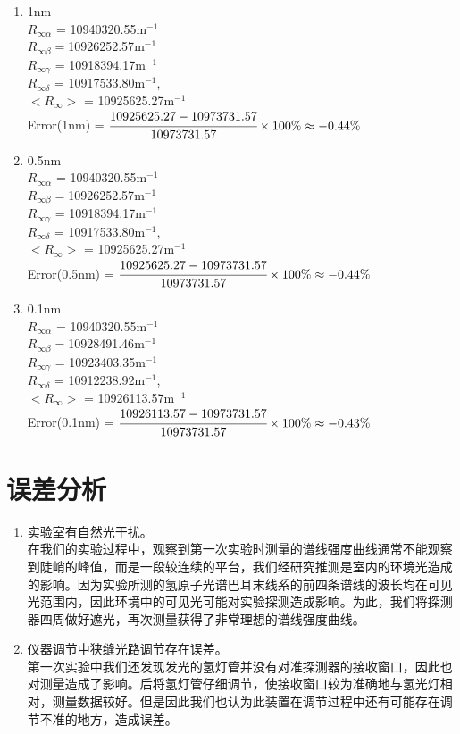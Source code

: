 \documentclass[a4paper]{article}
\begin{document}
\begin{enumerate}
\begin{enumerate}
\item 1nm\\
$R_{\infty\alpha}$ = 10940320.55$\text{m}^{-1}$\\
$R_{\infty\beta} = $10926252.57$\text{m}^{-1}$\\
$R_{\infty\gamma}$ = 10918394.17$\text{m}^{-1}$\\
$R_{\infty\delta}$ = 10917533.80$\text{m}^{-1}$,\\
$<R_{\infty}>$ = 10925625.27$\text{m}^{-1}$\\
Error(1nm) = $\cfrac{10925625.27 - 10973731.57}{10973731.57}\times 100\% \approx -0.44\%$
\item 0.5nm\\
$R_{\infty\alpha}$ = 10940320.55$\text{m}^{-1}$\\
$R_{\infty\beta} = $10926252.57$\text{m}^{-1}$\\
$R_{\infty\gamma}$ = 10918394.17$\text{m}^{-1}$\\
$R_{\infty\delta}$ = 10917533.80$\text{m}^{-1}$,\\
$<R_{\infty}>$ = 10925625.27$\text{m}^{-1}$\\
Error(0.5nm) = $\cfrac{10925625.27 - 10973731.57}{10973731.57}\times 100\% \approx -0.44\%$
\item 0.1nm\\
$R_{\infty\alpha}$ = 10940320.55$\text{m}^{-1}$\\
$R_{\infty\beta} = $10928491.46$\text{m}^{-1}$\\
$R_{\infty\gamma}$ = 10923403.35$\text{m}^{-1}$\\
$R_{\infty\delta}$ = 10912238.92$\text{m}^{-1}$,\\
$<R_{\infty}>$ = 10926113.57$\text{m}^{-1}$\\
Error(0.1nm) = $\cfrac{10926113.57 - 10973731.57}{10973731.57}\times 100\% \approx -0.43\%$
\end{enumerate}
\end{enumerate}

\section{误差分析}
\begin{enumerate}
\item 实验室有自然光干扰。\\
在我们的实验过程中，观察到第一次实验时测量的谱线强度曲线通常不能观察到陡峭的峰值，而是一段较连续的平台，我们经研究推测是室内的环境光造成的影响。因为实验所测的氢原子光谱巴耳末线系的前四条谱线的波长均在可见光范围内，因此环境中的可见光可能对实验探测造成影响。为此，我们将探测器四周做好遮光，再次测量获得了非常理想的谱线强度曲线。
\item 仪器调节中狭缝光路调节存在误差。\\
第一次实验中我们还发现发光的氢灯管并没有对准探测器的接收窗口，因此也对测量造成了影响。后将氢灯管仔细调节，使接收窗口较为准确地与氢光灯相对，测量数据较好。但是因此我们也认为此装置在调节过程中还有可能存在调节不准的地方，造成误差。
\end{enumerate}
\end{document}
